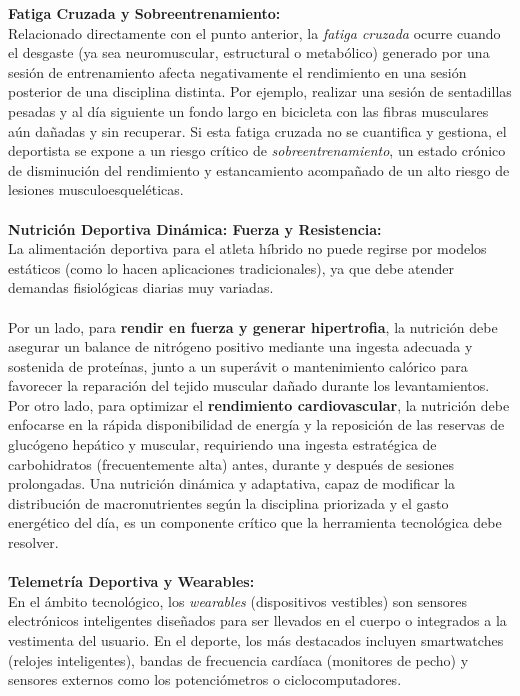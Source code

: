 \documentclass[12pt]{article}
\begin{document}
\textbf{Fatiga Cruzada y Sobreentrenamiento:\\}
Relacionado directamente con el punto anterior, la \textit{fatiga cruzada} ocurre cuando el desgaste (ya sea neuromuscular, estructural o metabólico) generado por una sesión de entrenamiento afecta negativamente el rendimiento en una sesión posterior de una disciplina distinta. Por ejemplo, realizar una sesión de sentadillas pesadas y al día siguiente un fondo largo en bicicleta con las fibras musculares aún dañadas y sin recuperar. Si esta fatiga cruzada no se cuantifica y gestiona, el deportista se expone a un riesgo crítico de \textit{sobreentrenamiento}, un estado crónico de disminución del rendimiento y estancamiento acompañado de un alto riesgo de lesiones musculoesqueléticas.
\\\\
\textbf{Nutrición Deportiva Dinámica: Fuerza y Resistencia:}\\
La alimentación deportiva para el atleta híbrido no puede regirse por modelos estáticos (como lo hacen aplicaciones tradicionales), ya que debe atender demandas fisiológicas diarias muy variadas. 
\\\\
Por un lado, para \textbf{rendir en fuerza y generar hipertrofia}, la nutrición debe asegurar un balance de nitrógeno positivo mediante una ingesta adecuada y sostenida de proteínas, junto a un superávit o mantenimiento calórico para favorecer la reparación del tejido muscular dañado durante los levantamientos. 
\newpage
Por otro lado, para optimizar el \textbf{rendimiento cardiovascular}, la nutrición debe enfocarse en la rápida disponibilidad de energía y la reposición de las reservas de glucógeno hepático y muscular, requiriendo una ingesta estratégica de carbohidratos (frecuentemente alta) antes, durante y después de sesiones prolongadas. Una nutrición dinámica y adaptativa, capaz de modificar la distribución de macronutrientes según la disciplina priorizada y el gasto energético del día, es un componente crítico que la herramienta tecnológica debe resolver.
\\\\
\textbf{Telemetría Deportiva y Wearables:}\\
En el ámbito tecnológico, los \textit{wearables} (dispositivos vestibles) son sensores electrónicos inteligentes diseñados para ser llevados en el cuerpo o integrados a la vestimenta del usuario. En el deporte, los más destacados incluyen smartwatches (relojes inteligentes), bandas de frecuencia cardíaca (monitores de pecho) y sensores externos como los potenciómetros o ciclocomputadores. 
\end{document}
